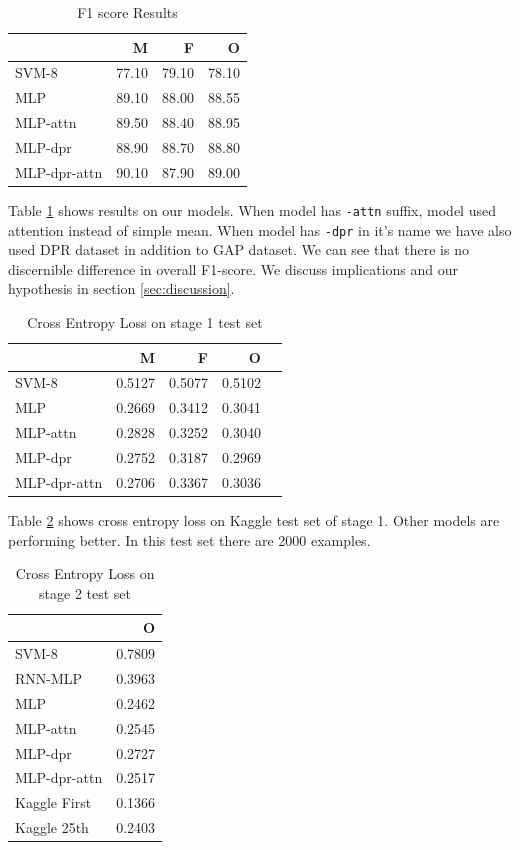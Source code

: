 \documentclass[11pt,a4paper]{article}
\begin{document}
\begin{table}
  \centering
  \begin{tabular}{|l|r|r|r|}
    \hline
    & M & F & O \\
    \hline
    SVM-8 & 77.10 & 79.10 & 78.10 \\
    \hline
    MLP             & 89.10 &88.00 & 88.55 \\
    MLP-attn         &  89.50 & 88.40 & 88.95 \\
    MLP-dpr           & 88.90 & 88.70 & 88.80 \\
    MLP-dpr-attn    & 90.10 & 87.90 & 89.00 \\
    \hline
  \end{tabular}
  \caption{F1 score Results}
  \label{tab:f1}
\end{table}

Table \ref{tab:f1} shows results on our models. When model has \texttt{-attn} suffix, model used attention instead of simple mean. When model has \texttt{-dpr} in it's name we have also used DPR dataset in addition to GAP dataset. We can see that there is no discernible difference in overall F1-score. We discuss implications and our hypothesis in section \ref{sec:discussion}.

\begin{table}
  \centering
  \begin{tabular}{|l|r|r|r|r|}
    \hline
    &M & F & O \\
    \hline
    SVM-8          & 0.5127 & 0.5077 & 0.5102 \\
    \hline
    MLP  & 0.2669 & 0.3412 & 0.3041 \\
    MLP-attn   & 0.2828 & 0.3252 & 0.3040 \\
    MLP-dpr      & 0.2752 & 0.3187 & 0.2969 \\
    MLP-dpr-attn & 0.2706 & 0.3367 & 0.3036 \\
    \hline
  \end{tabular}
  \caption{Cross Entropy Loss on stage 1 test set}
  \label{tab:ce1}
\end{table}

Table \ref{tab:ce1} shows cross entropy loss on Kaggle test set of stage 1.  Other models are performing better. In this test set there are 2000 examples.

\begin{table}
  \centering
  \begin{tabular}{|l|r|}
    \hline
    & O \\
    \hline
    SVM-8          &  0.7809 \\
    \hline
    RNN-MLP & 0.3963 \\
    \hline
    MLP  & 0.2462 \\
    MLP-attn   & 0.2545 \\
    MLP-dpr      & 0.2727 \\
    MLP-dpr-attn & 0.2517 \\
    \hline
    Kaggle First & 0.1366 \\
    Kaggle 25th & 0.2403 \\
    \hline
  \end{tabular}
  \caption{Cross Entropy Loss on stage 2 test set}
  \label{tab:ce2}
\end{table}
\end{document}
